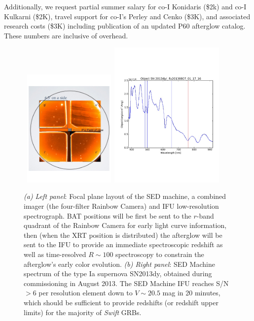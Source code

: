 \documentclass[letterpaper,11pt]{article}
\begin{document}
Additionally, we request partial summer salary for co-I Konidaris (\$2k) and
co-I Kulkarni (\$2K), travel support for co-I's Perley and Cenko
(\$3K), and associated research costs (\$3K) including publication of an
updated P60 afterglow catalog.  These numbers are inclusive of overhead. 

\begin{figure}[ht!]
\begin{center}
\hbox{
 \includegraphics[width=0.4\textwidth]{SEDM.pdf}
 \hspace{0.5cm}
 \includegraphics[width=0.5\textwidth]{SN2013dy.pdf}
 }
\end{center}
\caption{\footnotesize
{{\it (a) Left panel}: Focal plane layout of the SED machine, a combined imager 
(the four-filter Rainbow Camera) and IFU low-resolution spectrograph.  BAT positions 
will be first be sent to the $r$-band quadrant of the Rainbow Camera for early 
light curve information, then (when the XRT position is distributed) the afterglow 
will be sent to the IFU to provide an immediate spectroscopic redshift as well as 
time-resolved $R\sim100$ spectroscopy to constrain the afterglow's early color 
evolution. {\it (b) Right panel}: SED Machine spectrum of the type Ia supernova
SN2013dy, obtained during commissioning in August 2013. The SED Machine IFU
reaches S/N$>$6 per resolution element down to $V \sim 20.5$ mag in 20 minutes,
which should be sufficient to provide redshifts (or redshift upper limits) for
the majority of \textit{Swift} GRBs.}}
\label{fig2}
\end{figure}
\end{document}
